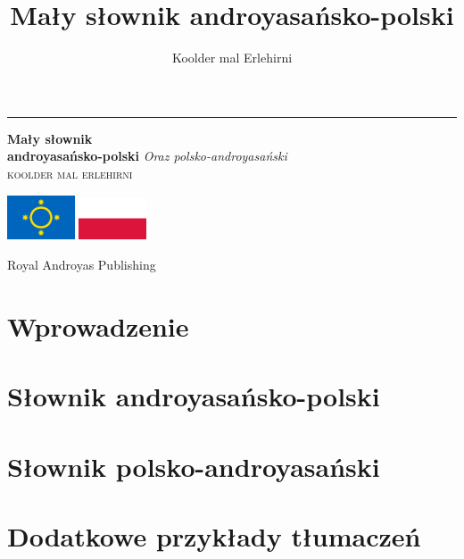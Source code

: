 \documentclass[openany, twoside, b5paper]{book}
\begin{document}
\author{Koolder mal Erlehirni}
\title{Mały słownik androyasańsko-polski}

\frontmatter

\begin{titlepage} %
    \newcommand*{\plogo}{\fbox{$\mathcal{AND}$}} %
    
	\raggedleft %
	
	\rule{1pt}{\textheight} %
	\hspace{0.05\textwidth} %
	\parbox[b]{0.75\textwidth}{ %
		
        {\Huge\bfseries Mały słownik\\ androyasańsko-polski}
        {\large\textit{Oraz polsko-androyasański}}\\[4\baselineskip]
		{\Large\textsc{koolder mal erlehirni}} %
        
        \bigskip

        \includegraphics[width=2cm]{androyas-flag}
        \includegraphics[width=2cm]{pl-flag}

        \vspace{0.5\textheight} %
		
		{\noindent Royal Androyas Publishing~~\plogo}\\[\baselineskip] %
	}

\end{titlepage}

\clearpage


\tableofcontents

\mainmatter
\chapter{Wprowadzenie}




\chapter{Słownik androyasańsko-polski}


\chapter{Słownik polsko-androyasański}


\chapter{Dodatkowe przykłady tłumaczeń}


\backmatter
\end{document}
